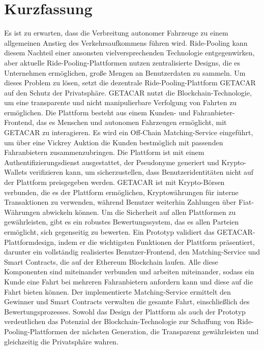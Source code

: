 \documentclass[
  a4paper,  %
  twoside,  %
  bibliography=totoc,
  headsepline,
  cleardoublepage=empty,
  parskip=half,
  draft=false
]{scrbook}
\begin{document}
  \section*{Kurzfassung}
Es ist zu erwarten, dass die Verbreitung autonomer Fahrzeuge zu einem allgemeinen Anstieg des Verkehrsaufkommens führen wird. Ride-Pooling kann diesem Nachteil einer ansonsten vielversprechenden Technologie entgegenwirken, aber aktuelle Ride-Pooling-Plattformen nutzen zentralisierte Designs, die es Unternehmen ermöglichen, große Mengen an Benutzerdaten zu sammeln. Um dieses Problem zu lösen, setzt die dezentrale Ride-Pooling-Plattform GETACAR auf den Schutz der Privatsphäre. GETACAR nutzt die Blockchain-Technologie, um eine transparente und nicht manipulierbare Verfolgung von Fahrten zu ermöglichen. Die Plattform besteht aus einem Kunden- und Fahranbieter-Frontend, das es Menschen und autonomen Fahrzeugen ermöglicht, mit GETACAR zu interagieren. Es wird ein Off-Chain Matching-Service eingeführt, um über eine Vickrey Auktion die Kunden bestmöglich mit passenden Fahranbietern zusammenzubringen. Die Plattform ist mit einem Authentifizierungsdienst ausgestattet, der Pseudonyme generiert und Krypto-Wallets verifizieren kann, um sicherzustellen, dass Benutzeridentitäten nicht auf der Plattform preisgegeben werden. GETACAR ist mit Krypto-Börsen verbunden, die es der Plattform ermöglichen, Kryptowährungen für interne Transaktionen zu verwenden, während Benutzer weiterhin Zahlungen über Fiat-Währungen abwickeln können. Um die Sicherheit auf allen Plattformen zu gewährleisten, gibt es ein robustes Bewertungssystem, das es allen Parteien ermöglicht, sich gegenseitig zu bewerten. Ein Prototyp validiert das GETACAR-Plattformdesign, indem er die wichtigsten Funktionen der Plattform präsentiert, darunter ein vollständig realisiertes Benutzer-Frontend, den Matching-Service und Smart Contracts, die auf der Ethereum Blockchain laufen. Alle diese Komponenten sind miteinander verbunden und arbeiten miteinander, sodass ein Kunde eine Fahrt bei mehreren Fahranbietern anfordern kann und diese auf die Fahrt bieten können. Der implementierte Matching-Service ermittelt den Gewinner und Smart Contracts verwalten die gesamte Fahrt, einschließlich des Bewertungsprozesses. Sowohl das Design der Plattform als auch der Prototyp verdeutlichen das Potenzial der Blockchain-Technologie zur Schaffung von Ride-Pooling-Plattformen der nächsten Generation, die Transparenz gewährleisten und gleichzeitig die Privatsphäre wahren.


\cleardoublepage
\end{document}
